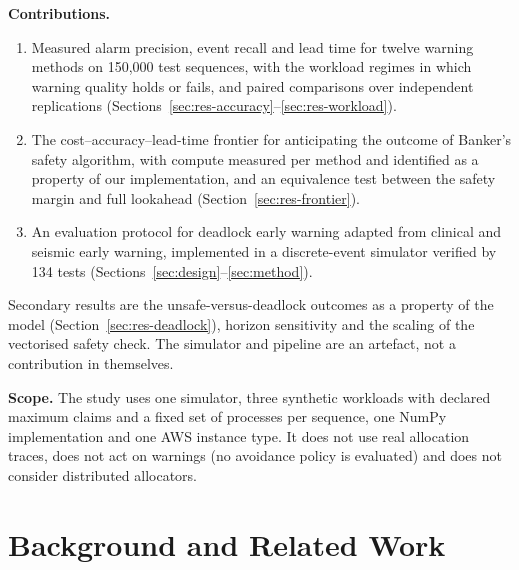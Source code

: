 \documentclass[conference]{IEEEtran}
\begin{document}
\textbf{Contributions.}
\begin{enumerate}
\item[C1] Measured alarm precision, event recall and lead time for twelve warning methods on 150,000 test sequences, with the workload regimes in which warning quality holds or fails, and paired comparisons over independent replications (Sections~\ref{sec:res-accuracy}--\ref{sec:res-workload}).
\item[C2] The cost--accuracy--lead-time frontier for anticipating the outcome of Banker's safety algorithm, with compute measured per method and identified as a property of our implementation, and an equivalence test between the safety margin and full lookahead (Section~\ref{sec:res-frontier}).
\item[C3] An evaluation protocol for deadlock early warning adapted from clinical and seismic early warning, implemented in a discrete-event simulator verified by 134 tests (Sections~\ref{sec:design}--\ref{sec:method}).
\end{enumerate}
Secondary results are the unsafe-versus-deadlock outcomes as a property of the model (Section~\ref{sec:res-deadlock}), horizon sensitivity and the scaling of the vectorised safety check. The simulator and pipeline are an artefact, not a contribution in themselves.

\textbf{Scope.} The study uses one simulator, three synthetic workloads with declared maximum claims and a fixed set of processes per sequence, one NumPy implementation and one AWS instance type. It does not use real allocation traces, does not act on warnings (no avoidance policy is evaluated) and does not consider distributed allocators.

\section{Background and Related Work}\label{sec:related}
\end{document}

